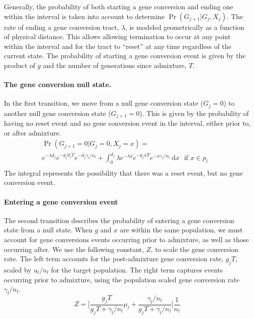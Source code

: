 Generally, the probability of both starting a gene conversion and ending one within the interval is taken into account to determine $\Pr(G_{j+1}|G_j,X_j)$.
The rate of ending a gene conversion tract, $\lambda$, is modeled geometrically as a function of physical distance.
This allows allowing termination to occur at any point within the interval and for the tract to ``reset'' at any time regardless of the current state. %
The probability of starting a gene conversion event is given by the product of $g$ and the number of generations since admixture, $T$.



\paragraph{The gene conversion null state.}
In the first transition, we move from a null gene conversion state ($G_j=0$) to another null gene conversion state ($G_{j+1}=0$).
This is given by the probability of having no reset event and no gene conversion event in the interval, either prior to, or after admixture.
%
\begin{equation} \label{eq:Gnull}
    \begin{split}
        \Pr(G_{j+1}=0|G_{j}=0,X_j=x) = \\
        e^{-\lambda d_j} e^{-g_j d_j T } e^{-d_j \gamma_l/n_l} +
    \int_0^{d_j} \lambda e^{-\lambda x} e^{-g_j x T } e^{-x \gamma_l/n_l } ~\mathrm{d}x ~~~
     \text{if $x \in p_l $ } \\%
\end{split}
\end{equation}
%
The integral represents the possibility that there was a reset event, but no gene conversion event.

\paragraph{Entering a gene conversion event}
The second transition describes the probability of entering a gene conversion state from a null state.
When $g$ and $x$ are within the same population, we must account for gene conversions events occurring prior to admixture, as well as those occurring after.
We use the following constant, $Z$, to scale the gene conversion rate.
The left term accounts for the post-admixture gene conversion rate, $g_j T$, scaled by $u_l/n_l$ for the target population.
The right term captures events occurring prior to admixture, using the population scaled gene conversion rate $\gamma_l/n_l$.
\newcommand{\constZ}{\bigg[ \frac{g_j T}{g_j T + \gamma_l/n_l} \mu_l + \frac{\gamma_l/n_l}{g_j T + \gamma_l/n_l}  \bigg] \frac{1}{n_l} }
\begin{equation} \label{eq:constZ}
    Z = \constZ
\end{equation}

